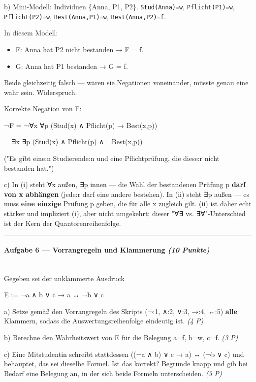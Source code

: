 \documentclass[11pt, a4paper]{article}
\begin{document}
b) Mini-Modell: Individuen \{Anna, P1, P2\}. \texttt{Stud(Anna)=w}, \texttt{Pflicht(P1)=w}, \texttt{Pflicht(P2)=w}, \texttt{Best(Anna,P1)=w}, \texttt{Best(Anna,P2)=f}.


In diesem Modell:

\begin{itemize}
  \item F: Anna hat P2 nicht bestanden → F = f.
  \item G: Anna hat P1 bestanden → G = f.
\end{itemize}

Beide gleichzeitig falsch — wären sie Negationen voneinander, müsste genau eine wahr sein. Widerspruch.


Korrekte Negation von F:

¬F = ¬∀x ∀p (Stud(x) ∧ Pflicht(p) → Best(x,p))

= ∃x ∃p (Stud(x) ∧ Pflicht(p) ∧ ¬Best(x,p))

("Es gibt eine:n Studierende:n und eine Pflichtprüfung, die diese:r nicht bestanden hat.")


c) In (i) steht ∀x außen, ∃p innen — die Wahl der bestandenen Prüfung p \textbf{darf von x abhängen} (jede:r darf eine andere bestehen). In (ii) steht ∃p außen — es muss \textbf{eine einzige} Prüfung p geben, die für alle x zugleich gilt. (ii) ist daher echt stärker und impliziert (i), aber nicht umgekehrt; dieser "∀∃ vs. ∃∀"-Unterschied ist der Kern der Quantorenreihenfolge.



\noindent\textcolor{rulegray}{\rule{\linewidth}{0.4pt}}


\paragraph{Aufgabe 6 — Vorrangregeln und Klammerung \textit{(10 Punkte)}}\mbox{}\\[2pt]

Gegeben sei der unklammerte Ausdruck


E := ¬a ∧ b ∨ c → a ↔ ¬b ∨ c


a) Setze gemäß den Vorrangregeln des Skripts (¬:1, ∧:2, ∨:3, →:4, ↔:5) \textbf{alle} Klammern, sodass die Auswertungsreihenfolge eindeutig ist. \textit{(4 P)}


b) Berechne den Wahrheitswert von E für die Belegung a=f, b=w, c=f. \textit{(3 P)}


c) Eine Mitstudentin schreibt stattdessen ((¬a ∧ b) ∨ c → a) ↔ (¬b ∨ c) und behauptet, das sei dieselbe Formel. Ist das korrekt? Begründe knapp und gib bei Bedarf eine Belegung an, in der sich beide Formeln unterscheiden. \textit{(3 P)}
\end{document}
